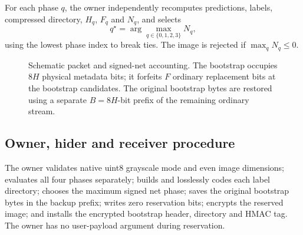 \documentclass[preprint,12pt,a4paper]{elsarticle}
\begin{document}
For each phase $q$, the owner independently recomputes predictions, labels, compressed directory, $H_q$, $F_q$ and $N_q$, and selects
\begin{equation}
q^\star=\arg\max_{q\in\{0,1,2,3\}}N_q,
\label{eq:phase-select}
\end{equation}
using the lowest phase index to break ties. The image is rejected if $\max_qN_q\le0$.

\begin{figure}[t]
\centering
{}
\caption{Schematic packet and signed-net accounting. The bootstrap occupies $8H$ physical metadata bits; it forfeits $F$ ordinary replacement bits at the bootstrap candidates. The original bootstrap bytes are restored using a separate $B=8H$-bit prefix of the remaining ordinary stream.}
\label{fig:packet}
\end{figure}

\subsection{Owner, hider and receiver procedure}

The owner validates native uint8 grayscale mode and even image dimensions; evaluates all four phases separately; builds and losslessly codes each label directory; chooses the maximum signed net phase; saves the original bootstrap bytes in the backup prefix; writes zero reservation bits; encrypts the reserved image; and installs the encrypted bootstrap header, directory and HMAC tag. The owner has no user-payload argument during reservation.
\end{document}
